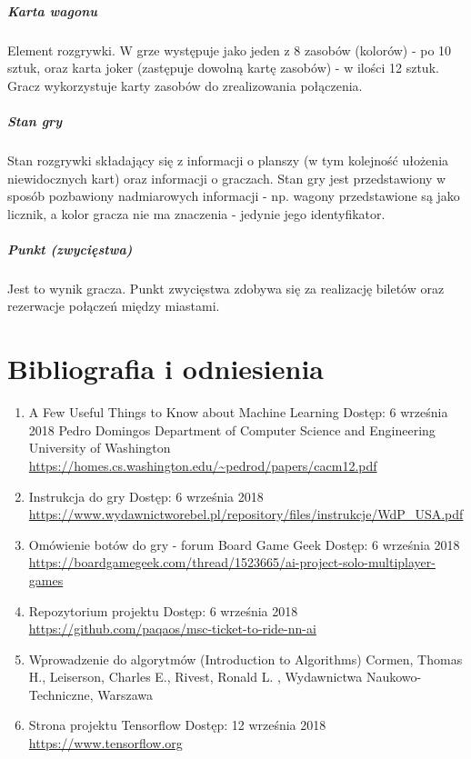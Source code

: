 \documentclass[12pt, oneside]{report}
\begin{document}
	\paragraph{Karta wagonu} Element rozgrywki. W grze występuje jako jeden z 8 zasobów (kolorów) - po 10 sztuk, oraz karta joker (zastępuje dowolną kartę zasobów) - w ilości 12 sztuk. Gracz wykorzystuje karty zasobów do zrealizowania połączenia.
	\paragraph{Stan gry} Stan rozgrywki składający się z informacji o planszy (w tym kolejność ułożenia niewidocznych kart) oraz informacji o graczach. Stan gry jest przedstawiony w sposób pozbawiony nadmiarowych informacji - np. wagony przedstawione są jako licznik, a kolor gracza nie ma znaczenia - jedynie jego identyfikator.
	\paragraph{Punkt (zwycięstwa)} Jest to wynik gracza. Punkt zwycięstwa zdobywa się za realizację biletów oraz rezerwacje połączeń między miastami.
	\chapter{Bibliografia i odniesienia}
	\begin{enumerate}
		\item{A Few Useful Things to Know about Machine Learning
		}
		\subitem Dostęp: 6 września 2018
		\subitem Pedro Domingos
		\subitem Department of Computer Science and Engineering
		\subitem University of Washington
		\subitem \url{https://homes.cs.washington.edu/~pedrod/papers/cacm12.pdf}
		
		\item{Instrukcja do gry}
		\subitem Dostęp: 6 września 2018
		\subitem \url{https://www.wydawnictworebel.pl/repository/files/instrukcje/WdP_USA.pdf}
		
		\item{Omówienie botów do gry - forum Board Game Geek}
		\subitem Dostęp: 6 września 2018
		\subitem \url{https://boardgamegeek.com/thread/1523665/ai-project-solo-multiplayer-games}
		\item{Repozytorium projektu}
		\subitem Dostęp: 6 września 2018
		\subitem \url{https://github.com/paqaos/msc-ticket-to-ride-nn-ai}
		\item{Wprowadzenie do algorytmów (Introduction to Algorithms)}
		\subitem Cormen, Thomas H., Leiserson, Charles E., Rivest, Ronald L.
		, Wydawnictwa Naukowo-Techniczne, Warszawa
		\item{Strona projektu Tensorflow}
		\subitem Dostęp: 12 września 2018
		\subitem \url{https://www.tensorflow.org}
	\end{enumerate}
	\listoffigures
	\listoftables
\end{document}
